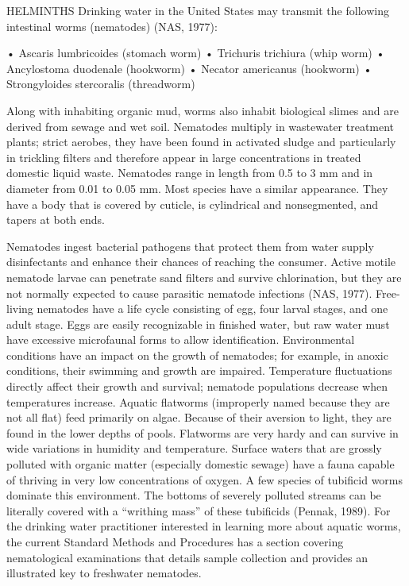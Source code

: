 \documentclass{article}
\begin{document}
HELMINTHS Drinking water in the United States may transmit the following
intestinal worms (nematodes) (NAS, 1977):

• Ascaris lumbricoides (stomach worm) • Trichuris trichiura (whip worm)
• Ancylostoma duodenale (hookworm) • Necator americanus (hookworm) •
Strongyloides stercoralis (threadworm)

Along with inhabiting organic mud, worms also inhabit biological slimes
and are derived from sewage and wet soil. Nematodes multiply in
wastewater treatment plants; strict aerobes, they have been found in
activated sludge and particularly in trickling filters and therefore
appear in large concentrations in treated domestic liquid waste.
Nematodes range in length from 0.5 to 3 mm and in diameter from 0.01 to
0.05 mm. Most species have a similar appearance. They have a body that
is covered by cuticle, is cylindrical and nonsegmented, and tapers at
both ends.

Nematodes ingest bacterial pathogens that protect them from water supply
disinfectants and enhance their chances of reaching the consumer. Active
motile nematode larvae can penetrate sand filters and survive
chlorination, but they are not normally expected to cause parasitic
nematode infections (NAS, 1977). Free-living nematodes have a life cycle
consisting of egg, four larval stages, and one adult stage. Eggs are
easily recognizable in finished water, but raw water must have excessive
microfaunal forms to allow identification. Environmental conditions have
an impact on the growth of nematodes; for example, in anoxic conditions,
their swimming and growth are impaired. Temperature fluctuations
directly affect their growth and survival; nematode populations decrease
when temperatures increase. Aquatic flatworms (improperly named because
they are not all flat) feed primarily on algae. Because of their
aversion to light, they are found in the lower depths of pools.
Flatworms are very hardy and can survive in wide variations in humidity
and temperature. Surface waters that are grossly polluted with organic
matter (especially domestic sewage) have a fauna capable of thriving in
very low concentrations of oxygen. A few species of tubificid worms
dominate this environment. The bottoms of severely polluted streams can
be literally covered with a ``writhing mass'' of these tubificids
(Pennak, 1989). For the drinking water practitioner interested in
learning more about aquatic worms, the current Standard Methods and
Procedures has a section covering nematological examinations that
details sample collection and provides an illustrated key to freshwater
nematodes.
\end{document}
